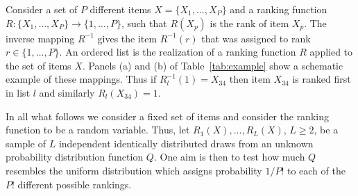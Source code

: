 \documentclass[12pt,a4paper]{article}
\theoremstyle{plain}
\begin{document}
Consider a set of $P$ different items $X=\{X_1,\dots,X_P\}$ and a
ranking function $R: \{X_1,\dots,X_P\}\to \{1,\dots,P\}$, such that
$R(X_p)$ is the rank of item $X_p$. The inverse mapping $R^{-1}$ gives
the item $R^{-1}(r)$ that was assigned to rank $r\in\{1,\dots,P\}$. An
ordered list is the realization of a ranking function $R$ applied to
the set of items $X$.  Panels (a) and (b) of Table~\ref{tab:example}
show a schematic example of these mappings. Thus if
$R_l^{-1}(1)=X_{34}$ then item $X_{34}$ is ranked first in list $l$
and similarly $R_l(X_{34})=1$.

In all what follows we consider a fixed set of items and consider the
ranking function to be a random variable. Thus, let
$R_1(X),\dots,R_L(X)$, $L\geq2$, be a sample of $L$ independent
identically distributed draws from an unknown probability distribution
function $Q$. One aim is then to test how much $Q$ resembles the
uniform distribution which assigns probability $1/P!$ to each of the
$P!$ different possible rankings. 
\end{document}
